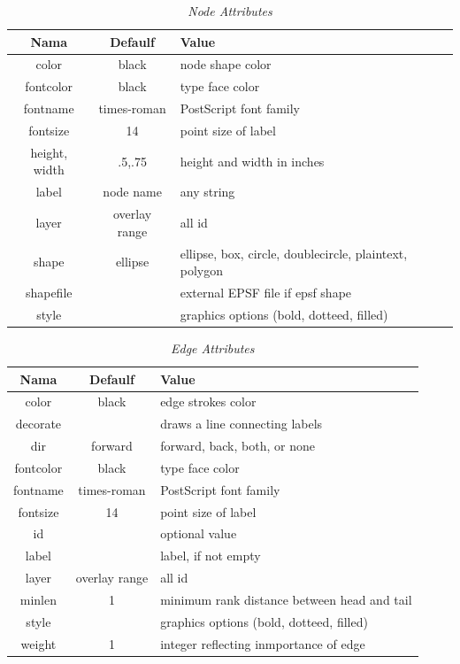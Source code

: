 \begin{enumerate}
\begin{enumerate}
\begin{table}[htbp]
\begin{center}
\caption{\textit{Node Attributes}}
\begin{tabular}{|c|c|l|}
\hline
  Nama & Defaulf & Value \\
\hline
  color & black & node shape color \\
  fontcolor & black & type face color \\
  fontname & times-roman & PostScript font family \\
  fontsize & 14 & point size of label \\
  height, width & .5,.75 & height and width in inches \\
  label & node name & any string \\
  layer & overlay range & all id \\
  shape & ellipse & ellipse, box, circle, doublecircle, plaintext, polygon \\
  shapefile & & external EPSF file if epsf shape \\
  style & & graphics options (bold, dotteed, filled)\\
\hline
\end{tabular}
\end{center}
\end{table}

\begin{table}[htbp]
\begin{center}
\caption{\textit{Edge Attributes}}
\begin{tabular}{|c|c|l|}
\hline
  Nama & Defaulf & Value \\
\hline
  color & black & edge strokes color \\
  decorate & & draws a line connecting labels \\
  dir & forward & forward, back, both, or none \\
  fontcolor & black & type face color \\
  fontname & times-roman & PostScript font family \\
  fontsize & 14 & point size of label \\
  id & & optional value \\
  label & & label, if not empty \\
  layer & overlay range & all id \\
  minlen & 1 & minimum rank distance between head and tail \\
  style & & graphics options (bold, dotteed, filled) \\
  weight & 1 & integer reflecting inmportance of edge \\
  

\end{tabular}
\end{center}
\end{table}
\end{enumerate}
\end{enumerate}
